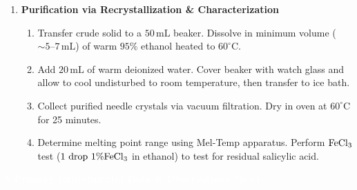 \documentclass[10pt,a4paper]{article}
\newcommand{\labsection}[2]{%
  \vspace{0.25cm}%
  \begin{tcolorbox}[
    enhanced,
    colback=NavyDark,
    colframe=NavyDark,
    arc=3pt,
    boxrule=0pt,
    left=8pt, right=8pt, top=3pt, bottom=3pt
  ]
    \textcolor{white}{\bfseries\small #1 \quad #2}
  \end{tcolorbox}%
  \vspace{0.05cm}%
}
\begin{document}
\begin{tcolorbox}[
  enhanced,
  colback=white,
  colframe=BorderGray,
  boxrule=0.5pt,
  arc=3pt,
  left=8pt, right=8pt, top=6pt, bottom=6pt
]
\begin{enumerate}[label=\textbf{Part \Alph*:}, leftmargin=3em, itemsep=5pt, topsep=2pt]
  \item \textbf{Purification via Recrystallization \& Characterization}
    \begin{enumerate}[label=\arabic*., leftmargin=1.5em, itemsep=2pt]
      \item Transfer crude solid to a $50\,\text{mL}$ beaker. Dissolve in minimum volume ($\sim 5\text{--}7\,\text{mL}$) of warm $95\%$ ethanol heated to $60^\circ\text{C}$.
      \item Add $20\,\text{mL}$ of warm deionized water. Cover beaker with watch glass and allow to cool undisturbed to room temperature, then transfer to ice bath.
      \item Collect purified needle crystals via vacuum filtration. Dry in oven at $60^\circ\text{C}$ for 25 minutes.
      \item Determine melting point range using Mel-Temp apparatus. Perform $\ce{FeCl3}$ test ($1\text{ drop } 1\% \ce{FeCl3}$ in ethanol) to test for residual salicylic acid.
    \end{enumerate}
\end{enumerate}
\end{tcolorbox}

\vspace{0.1cm}

\labsection{5}{Primary Experimental Data \& Observations Sheet}
\end{document}
